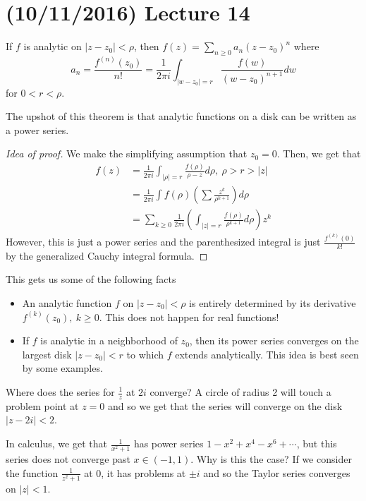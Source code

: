 \documentclass[11pt,leqno,oneside]{amsart}
\numberwithin{thm}{section}
\begin{document}
  \section{(10/11/2016) Lecture 14}
  \begin{thm}
    If $f$ is analytic on $|z-z_0|<\rho$, then $f(z) = \sum_{n \geq 0}
    a_n(z-z_0)^n$ where \[a_n = \frac{f^{(n)}(z_0)}{n!} =
      \frac{1}{2\pi i}\int_{|w - z_0| = r}
      \frac{f(w)}{(w-z_0)^{n+1}}dw \]
    for $0 < r < \rho$.
  \end{thm}
  The upshot of this theorem is that analytic functions on a disk can
  be written as a power series.
  \begin{proof}[Idea of proof]
    We make the simplifying assumption that $z_0 = 0$. Then, we get
    that
    \begin{align*}
      f(z) & = \frac{1}{2 \pi i} \int_{|\rho| = r}
             \frac{f(\rho)}{\rho-z}d\rho, \ \rho > r > |z| \\
      \ & = \frac{1}{2\pi i} \int f(\rho)
          \left(
          \sum \frac{z^k}{\rho^{k+1}}
          \right) d \rho \\
      \ & = \sum_{k \geq 0} \frac{1}{2 \pi i}
          \left(
          \int_{|z|=r} \frac{f(\rho)}{\rho^{k+1}}d\rho
          \right)z^k
    \end{align*}
    However, this is just a power series and the parenthesized
    integral is just $\frac{f^{(k)}(0)}{k!}$ by the generalized Cauchy
    integral formula.
  \end{proof}
  This gets us some of the following facts
  \begin{itemize}
  \item An analytic function $f$ on $|z-z_0| < \rho$ is entirely
    determined by its derivative $f^{(k)}(z_0), \ k \geq 0$. This does
    not happen for real functions!
  \item If $f$ is analytic in a neighborhood of $z_0$, then its power
    series converges on the largest disk $|z-z_0| < r$ to which $f$
    extends analytically. This idea is best seen by some examples.
  \end{itemize}
  \begin{example}
    Where does the series for $\frac{1}{z}$ at $2i$ converge? A circle
    of radius 2 will touch a problem point at $z=0$ and so we get that
    the series will converge on the disk $|z-2i| < 2$.
  \end{example}
  \begin{example}
    In calculus, we get that $\frac{1}{x^2+1}$ has power series
    $1-x^2+x^4-x^6+\cdots$, but this series does not converge past $x
    \in (-1,1)$. Why is this the case? If we consider the function
    $\frac{1}{z^2+1}$ at 0, it has problems at $\pm i$ and so the
    Taylor series converges on $|z|<1$.
  \end{example}
\end{document}
